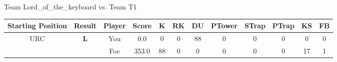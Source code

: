 \documentclass[a4paper,12pt]{article}
\begin{document}
\begin{tabular}[t]{| c | c | c | c | c | c | c | c | c | c | c | c
      |}
                      
      
                      
      
                      
                        \hline
                      \end{tabular}
                      
  \vspace*{2em}
  \par {\large {\color{Gray} Team} Lord\_of\_the\_keyboard {\color{Gray}
      vs. Team} T1}
  \newline
  \begin{tabular}[t]{| c | c | c | c | c | c | c | c | c | c | c | c
      |}
    \hline
    Starting Position & \textbf{Result} & Player & \textbf{Score} & K & RK & DU & PTower & STrap & PTrap & KS & FB \\
    
      
                      
      
                      
      
                      
      
        \hline
        \multirow{2}{*}{  URC
             } &
              \multirow{2}{*}{  \textbf{L}  } & 
                    \cellcolor{yellow!25} You & \cellcolor{yellow!25} 0.0 & \cellcolor{yellow!25} 0 &
                    \cellcolor{yellow!25} 0 & \cellcolor{yellow!25} 88 & \cellcolor{yellow!25} 0 &
                    \cellcolor{yellow!25} 0 & \cellcolor{yellow!25} 0 & \cellcolor{yellow!25} 0 &
                    \cellcolor{yellow!25} 0 \\
                    \cline{3-12}
                    & & \cellcolor{red!15} Foe & \cellcolor{red!15} 353.0 & \cellcolor{red!15} 88 & \cellcolor{red!15}
                    0 & \cellcolor{red!15} 0
                    & \cellcolor{red!15} 0 & \cellcolor{red!15}
                    0 & \cellcolor{red!15} 0 
                    & \cellcolor{red!15} 17 & \cellcolor{red!15}
                    1 \\
                    
                      
      
                      
      
                      
      
                      
      
                      
      
                      
      
                      
      

\end{tabular}
\end{document}
